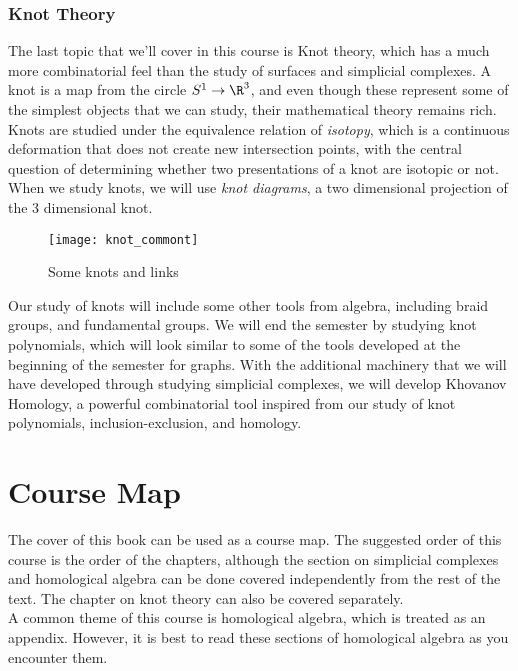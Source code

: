 \subsubsection{Knot Theory}
The last topic that we'll cover in this course is Knot theory, which has a much more combinatorial feel than the study of surfaces and simplicial complexes. 
 A knot is a map from the circle $S^1\to \R^3$, and even though these represent some of the simplest objects that we can study, their mathematical theory remains rich. Knots are studied under the equivalence relation of \emph{isotopy}, which is a continuous deformation that does not create new intersection points, with the central question of determining whether two presentations of a knot are isotopic or not. When we study knots, we will use \emph{knot diagrams}, a two dimensional projection of the 3 dimensional knot. 

\begin{wrapfigure}{r}{5cm}
	\centering
	\texttt{[image: knot\_commont]}
	\caption{Some knots and links}
	\label{fig:knotintro}
\end{wrapfigure}
 Our study of knots will include some other tools from algebra, including braid groups, and fundamental groups. We will  end the semester by studying knot polynomials, which will look similar to some of the tools developed at the beginning of the semester for graphs. With the additional machinery that we will have developed through studying simplicial complexes, we will develop Khovanov Homology, a powerful combinatorial tool inspired from our study of knot polynomials, inclusion-exclusion, and homology. 
\section{Course Map}
The cover of this book can be used as a course map. The suggested order of this course is the order of the chapters, although the section on simplicial complexes and homological algebra can be done covered independently from the rest of the text. The chapter on knot theory can also be covered separately.\\
A common theme of this course is homological algebra, which is treated as an appendix. However, it is best to read these sections of homological algebra as you encounter them. 
 \leavevmode\thispagestyle{empty}\newpage
{}